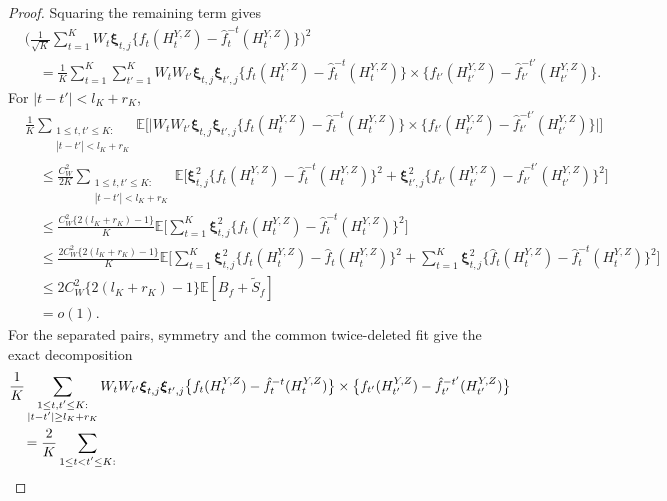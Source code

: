 \documentclass[12pt]{article}
\def\E{\mathbb{E}}
\numberwithin{equation}{section}
\begin{document}
\begin{proof}
Squaring the remaining term gives
\begin{equation}
\label{eq:outcome-square-expansion}
\begin{aligned}
&\Big(\frac1{\sqrt K}\sum_{t=1}^K W_t\boldsymbol\xi_{t,j}
\big\{f_t(H_t^{Y,Z})-\hat f_t^{-t}(H_t^{Y,Z})\big\}\Big)^2\\
&\quad=\frac1K\sum_{t=1}^K\sum_{t'=1}^K
W_tW_{t'}\boldsymbol\xi_{t,j}\boldsymbol\xi_{t',j}
\big\{f_t(H_t^{Y,Z})-\hat f_t^{-t}(H_t^{Y,Z})\big\}\times
\big\{f_{t'}(H_{t'}^{Y,Z})
-\hat f_{t'}^{-t'}(H_{t'}^{Y,Z})\big\}.
\end{aligned}
\end{equation}
For \(|t-t'|<l_K+r_K\),
\begin{align*}
&\frac1K\sum_{\substack{1\leq t,t'\leq K:\\
|t-t'|<l_K+r_K}}
\E\Big[
\Big|W_tW_{t'}\boldsymbol\xi_{t,j}\boldsymbol\xi_{t',j}
\big\{f_t(H_t^{Y,Z})-\hat f_t^{-t}(H_t^{Y,Z})\big\}\times
\big\{f_{t'}(H_{t'}^{Y,Z})
-\hat f_{t'}^{-t'}(H_{t'}^{Y,Z})\big\}\Big|
\Big]\\
&\quad\leq\frac{C_W^2}{2K}
\sum_{\substack{1\leq t,t'\leq K:\\
|t-t'|<l_K+r_K}}
\E\Big[
\boldsymbol\xi_{t,j}^2
\big\{f_t(H_t^{Y,Z})-\hat f_t^{-t}(H_t^{Y,Z})\big\}^2+
\boldsymbol\xi_{t',j}^2
\big\{f_{t'}(H_{t'}^{Y,Z})
-\hat f_{t'}^{-t'}(H_{t'}^{Y,Z})\big\}^2
\Big]\\
&\quad\leq\frac{C_W^2\{2(l_K+r_K)-1\}}K
\E\Big[
\sum_{t=1}^K\boldsymbol\xi_{t,j}^2
\big\{f_t(H_t^{Y,Z})-\hat f_t^{-t}(H_t^{Y,Z})\big\}^2
\Big]\\
&\quad\leq\frac{2C_W^2\{2(l_K+r_K)-1\}}K
\E\Big[
\sum_{t=1}^K\boldsymbol\xi_{t,j}^2
\big\{f_t(H_t^{Y,Z})-\hat f_t(H_t^{Y,Z})\big\}^2+
\sum_{t=1}^K\boldsymbol\xi_{t,j}^2
\big\{\hat f_t(H_t^{Y,Z})-\hat f_t^{-t}(H_t^{Y,Z})\big\}^2
\Big]\\
&\quad\leq
2C_W^2\{2(l_K+r_K)-1\}\E[B_f+\tilde S_f]\\
&\quad=o(1).
\end{align*}
For the separated pairs, symmetry and the common twice-deleted fit
give the exact decomposition
\begin{align}
&\frac1K\sum_{\substack{1\leq t,t'\leq K:\\
|t-t'|\geq l_K+r_K}}
W_tW_{t'}\boldsymbol\xi_{t,j}\boldsymbol\xi_{t',j}
\big\{f_t(H_t^{Y,Z})-\hat f_t^{-t}(H_t^{Y,Z})\big\}
\times
\big\{f_{t'}(H_{t'}^{Y,Z})
-\hat f_{t'}^{-t'}(H_{t'}^{Y,Z})\big\}
\notag\\
&\quad=\frac2K\sum_{\substack{1\leq t<t'\leq K:\\
}}
\end{align}
\end{proof}
\end{document}
